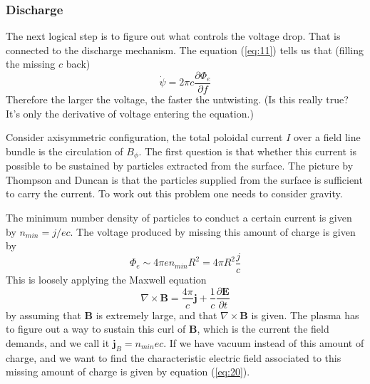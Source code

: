 \documentclass[letterpaper, 11pt]{article}
\numberwithin{equation}{section}
\numberwithin{figure}{section}
\begin{document}
\subsubsection{Discharge}
\label{sec:discharge}

The next logical step is to figure out what controls the voltage drop. That is connected to the discharge mechanism. The equation (\ref{eq:11}) tells us that (filling the missing $c$ back)
\begin{equation}
    \label{eq:19}
    \dot{\psi} = 2\pi c\frac{\partial \Phi_e}{\partial f}
\end{equation}
Therefore the larger the voltage, the faster the untwisting. (Is this really true? It's only the derivative of voltage entering the equation.)

Consider axisymmetric configuration, the total poloidal current $I$ over a field line bundle is the circulation of $B_{\phi}$. The first question is that whether this current is possible to be sustained by particles extracted from the surface. The picture by Thompson and Duncan is that the particles supplied from the surface is sufficient to carry the current. To work out this problem one needs to consider gravity.

The minimum number density of particles to conduct a certain current is given by $n_{min} = j/ec$. The voltage produced by missing this amount of charge is given by
\begin{equation}
    \label{eq:20}
    \Phi_{e} \sim 4\pi e n_{min}R^2 = 4\pi R^2\frac{j}{c}
\end{equation}
This is loosely applying the Maxwell equation
\begin{equation}
    \label{eq:21}
    \nabla\times \boldsymbol{B} = \frac{4\pi}{c}\boldsymbol{j} + \frac{1}{c}\frac{\partial \boldsymbol{E}}{\partial t}
\end{equation}
by assuming that $\boldsymbol{B}$ is extremely large, and that $\nabla\times \boldsymbol{B}$ is given. The plasma has to figure out a way to sustain this curl of $\boldsymbol{B}$, which is the current the field demands, and we call it $\boldsymbol{j}_{B} = n_{min}ec$. If we have vacuum instead of this amount of charge, and we want to find the characteristic electric field associated to this missing amount of charge is given by equation (\ref{eq:20}).
\end{document}
